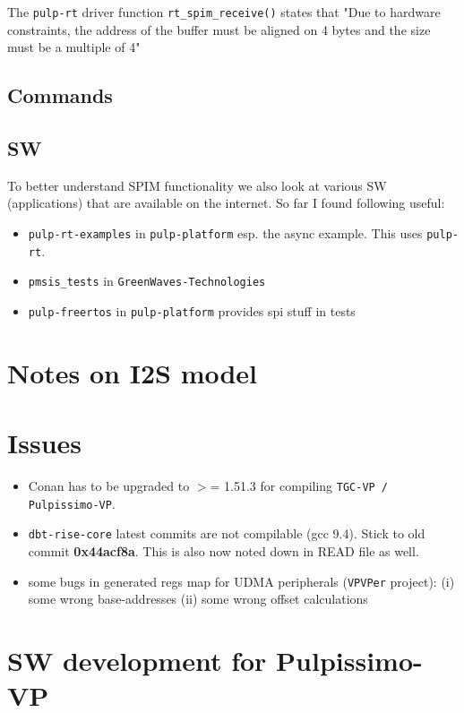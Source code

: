 \documentclass{article}
\begin{document}
The \texttt{pulp-rt} driver function \texttt{rt\_spim\_receive()} states that "Due to hardware constraints, the address
of the buffer must be aligned on 4 bytes and the size must be a multiple of 4"

\subsection{Commands}

\subsection{SW}
To better understand SPIM functionality we also look at various SW (applications) that are available on the internet.
So far I found following useful:
\begin{itemize}
 \item \texttt{pulp-rt-examples} in \texttt{pulp-platform} esp. the async example. This uses \texttt{pulp-rt}.
 \item  \texttt{pmsis\_tests} in \texttt{GreenWaves-Technologies}
 \item \texttt{pulp-freertos} in \texttt{pulp-platform} provides spi stuff in tests
\end{itemize}


\section{Notes on I2S model}

\section{Issues}
\begin{itemize}
 \item Conan has to be upgraded to $>$= 1.51.3 for compiling \texttt{TGC-VP / Pulpissimo-VP}.
 \item \texttt{dbt-rise-core} latest commits are not compilable (gcc 9.4). Stick to old commit \textbf{0x44acf8a}.
       This is also now noted down in READ file as well.
 \item some bugs in generated regs map for UDMA peripherals (\texttt{VPVPer} project):
       (i) some wrong base-addresses (ii) some wrong offset calculations
\end{itemize}

\section{SW development for Pulpissimo-VP}
\end{document}
